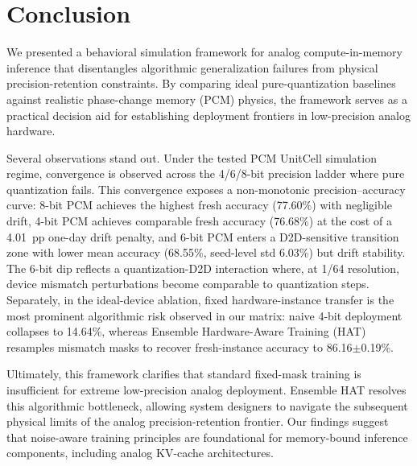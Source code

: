 \section{Conclusion}
\label{sec:conclusion}

We presented a behavioral simulation framework for analog compute-in-memory inference that disentangles algorithmic generalization failures from physical precision-retention constraints. By comparing ideal pure-quantization baselines against realistic phase-change memory (PCM) physics, the framework serves as a practical decision aid for establishing deployment frontiers in low-precision analog hardware.

Several observations stand out. Under the tested PCM UnitCell simulation regime, convergence is observed across the 4/6/8-bit precision ladder where pure quantization fails. This convergence exposes a non-monotonic precision--accuracy curve: 8-bit PCM achieves the highest fresh accuracy (77.60\%) with negligible drift, 4-bit PCM achieves comparable fresh accuracy (76.68\%) at the cost of a 4.01~pp one-day drift penalty, and 6-bit PCM enters a D2D-sensitive transition zone with lower mean accuracy (68.55\%, seed-level std 6.03\%) but drift stability. The 6-bit dip reflects a quantization-D2D interaction where, at 1/64 resolution, device mismatch perturbations become comparable to quantization steps. Separately, in the ideal-device ablation, fixed hardware-instance transfer is the most prominent algorithmic risk observed in our matrix: naive 4-bit deployment collapses to 14.64\%, whereas Ensemble Hardware-Aware Training (HAT) resamples mismatch masks to recover fresh-instance accuracy to 86.16$\pm$0.19\%.

Ultimately, this framework clarifies that standard fixed-mask training is insufficient for extreme low-precision analog deployment. Ensemble HAT resolves this algorithmic bottleneck, allowing system designers to navigate the subsequent physical limits of the analog precision-retention frontier. Our findings suggest that noise-aware training principles are foundational for memory-bound inference components, including analog KV-cache architectures.
